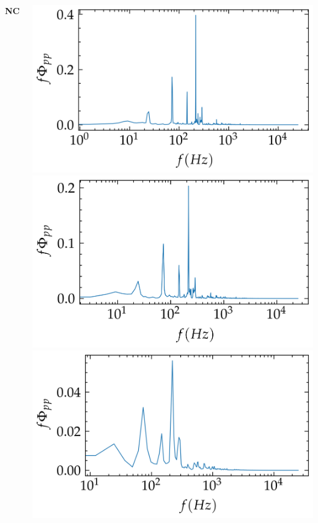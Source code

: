 \documentclass[aspectratio=169,10pt]{beamer}
\begin{document}
\begin{frame}
\begin{columns}[c]
            \centering
            \textbf{NC}
            \par\medskip
            \includegraphics[width=0.5\linewidth]{../figures/cali_09/flow/raw/Pyy_nc_atm_npsg32768.png}
            \includegraphics[width=0.5\linewidth]{../figures/cali_09/flow/raw/Pyy_nc_atm_npsg16384.png}
            \includegraphics[width=0.5\linewidth]{../figures/cali_09/flow/raw/Pyy_nc_atm_npsg4096.png}
    \end{columns}
\end{frame}
\end{document}
